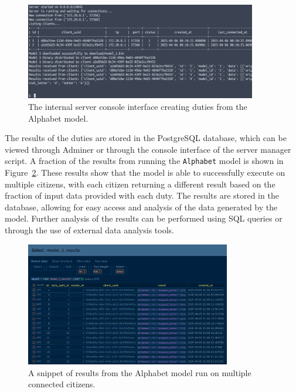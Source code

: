 \documentclass[11pt]{article}
\begin{document}
\begin{figure}[h]
    \centering
    \includegraphics[width=0.9\textwidth]{./figures/internal_server.png}
    \caption{\small The internal server console interface creating duties from the Alphabet model.}\label{fig:internal_server}
\end{figure}

The results of the duties are stored in the PostgreSQL database, which can be viewed through Adminer or through the console interface of the server manager script. A fraction of the results from running the \verb|Alphabet| model is shown in Figure~\ref{fig:alphabet_1}. These results show that the model is able to successfully execute on multiple citizens, with each citizen returning a different result based on the fraction of input data provided with each duty. The results are stored in the database, allowing for easy access and analysis of the data generated by the model. Further analysis of the results can be performed using SQL queries or through the use of external data analysis tools.

\begin{figure}[h]
    \centering
    \includegraphics[width=0.8\textwidth]{./figures/alphabet.png}
    \caption{\small A snippet of results from the Alphabet model run on multiple connected citizens.}\label{fig:alphabet_1}
\end{figure}

\newpage
\end{document}
